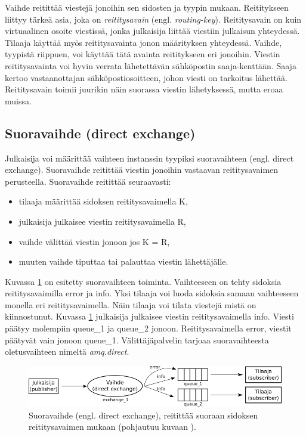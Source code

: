 Vaihde reitittää viestejä jonoihin sen sidosten ja tyypin mukaan. Reititykseen liittyy tärkeä asia, joka on \emph{reititysavain} (engl. \emph{routing-key}). Reititysavain on kuin virtuaalinen osoite viestissä, jonka julkaisija liittää viestiin julkaisun yhteydessä. Tilaaja käyttää myös reititysavainta jonon määrityksen yhteydessä. Vaihde, tyypistä riippuen, voi käyttää tätä avainta reititykseen eri jonoihin. Viestin reititysavainta voi hyvin verrata lähetettävän sähköpostin saaja-kenttään. Saaja kertoo vastaanottajan sähköpostiosoitteen, johon viesti on tarkoitus lähettää. Reititysavain toimii juurikin näin suorassa viestin lähetyksessä, mutta eroaa muissa.


\subsection{Suoravaihde (direct exchange)}
\label{ch:direct-exchange}
Julkaisija voi määrittää vaihteen instanssin tyypiksi suoravaihteen (engl. direct exchange). Suoravaihde reitittää viestin jonoihin vastaavan reititysavaimen perusteella. Suoravaihde reitittää seuraavasti:
\begin{itemize}
	\item tilaaja määrittää sidoksen reititysavaimella K,
	\item julkaisija julkaisee viestin reititysavaimella R,
	\item vaihde välittää viestin jonoon jos K = R,
	\item muuten vaihde tiputtaa tai palauttaa viestin lähettäjälle.
\end{itemize}
Kuvassa \ref{fig:amqp-direct-exchange} on esitetty suoravaihteen toiminta. Vaihteeseen on tehty sidoksia reititysavaimilla error ja info. Yksi tilaaja voi luoda sidoksia samaan vaihteeseen monella eri reititysavaimella. Näin tilaaja voi tilata viestejä mistä on kiinnostunut. Kuvassa \ref{fig:amqp-direct-exchange} julkaisija julkaisee viestin reititysavaimella info. Viesti päätyy molempiin queue\_1 ja queue\_2 jonoon. Reititysavaimella error, viestit päätyvät vain jonoon queue\_1. Välittäjäpalvelin tarjoaa suoravaihteesta oletusvaihteen nimeltä \emph{amq.direct}. \mbox{\cite[s.~27]{AMQP-specification}}

\begin{figure}[ht!]
	\includegraphics[width=1\textwidth]{pictures/amqp-direct-exchange.png}
	\caption{Suoravaihde (engl. direct exchange), reitittää suoraan sidoksen reititysavaimen mukaan (pohjautuu kuvaan \mbox{\cite{RabbitMQ-Tutorial-Routing}}).}
	\label{fig:amqp-direct-exchange}
\end{figure}


